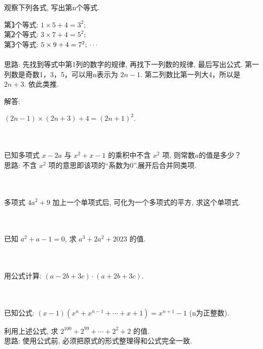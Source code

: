 \item {
    观察下列各式, 写出第n个等式.

    第\textcircled{1}个等式: $1\times 5 + 4 = 3^2;$ \\
    第\textcircled{2}个等式: $3\times 7 + 4 = 5^2;$ \\
    第\textcircled{3}个等式: $5\times 9 + 4 = 7^2; \\ \cdots $ \\
    \ifshowSolution
        \fangsong{}
        \\
        思路: 先找到等式中第1列的数字的规律, 再找下一列数的规律, 最后写出公式. 第一列数是奇数1，3，5，可以用n表示为 $2n-1$. 第二列数比第一列大4，所以是$2n+3$. 依此类推.

        解答: 

        $(2n-1)\times (2n+3) + 4 = (2n+1)^2$.
    \else
        \\ \\ \\
    \fi
}

\item {
    已知多项式 $x-2a$ 与 $x^2+x-1$ 的乘积中不含 $x^2$ 项, 则常数$a$的值是多少？
    \ifshowSolution
    \fangsong{}
    \\
    思路: 不含 $x^2$ 项的意思即该项的“系数为0”.展开后合并同类项.
    \else
        \\ \\ \\
    \fi
}

\item {
    多项式 $4a^2+9$ 加上一个单项式后, 可化为一个多项式的平方, 求这个单项式.
}
\\ \\ \\

\item {
    已知 $a^2+a-1=0$, 求 $a^3 + 2a^2 + 2023$ 的值.
}
\\ \\ \\

\item {
    用公式计算: $(a-2b+3c)\cdot (a+2b+3c)$.
}
\\ \\ \\

\item {
    已知公式: $(x-1)(x^n + x^{n-1} + \cdots + x + 1) = x^{n+1} - 1$ (n为正整数).
    
    利用上述公式, 求 $2^{100} + 2^{99} +\cdots + 2^2 + 2$ 的值.
    \ifshowSolution
        \fangsong{}
        \\
        思路: 使用公式前, 必须把原式的形式整理得和公式完全一致.
    \else
        \\ \\ \\
    \fi
}

